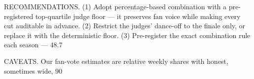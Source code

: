 RECOMMENDATIONS. (1) Adopt percentage-based combination with a pre-registered top-quartile judge floor — it preserves fan voice while making every cut auditable in advance. (2) Restrict the judges' dance-off to the finale only, or replace it with the deterministic floor. (3) Pre-register the exact combination rule each season — 48.7%

CAVEATS. Our fan-vote estimates are relative weekly shares with honest, sometimes wide, 90%
